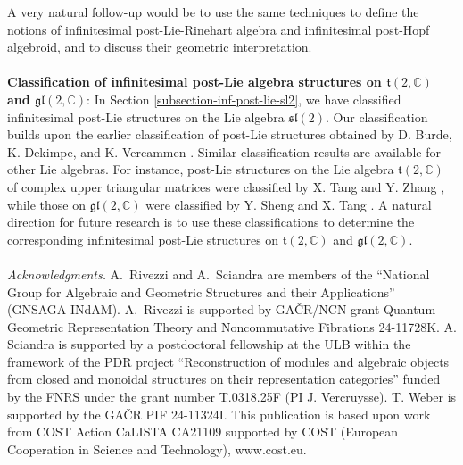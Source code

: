 \documentclass[10pt]{article}
\theoremstyle{definition}
\begin{document}
A very natural follow-up would be to use the same techniques to define the notions of infinitesimal post-Lie-Rinehart algebra and infinitesimal post-Hopf algebroid, and to discuss their geometric interpretation.\\ \\
\textbf{Classification of infinitesimal post-Lie algebra structures on $\mathfrak{t}(2,\mathbb{C})$ and $\mathfrak{gl}(2,\mathbb{C})$}: In Section \ref{subsection-inf-post-lie-sl2}, we have classified infinitesimal post-Lie structures on the Lie algebra $\mathfrak{sl}(2)$. Our classification builds upon the earlier classification of post-Lie structures obtained by D. Burde, K. Dekimpe, and K. Vercammen \cite{BDV}. Similar classification results are available for other Lie algebras. For instance, post-Lie structures on the Lie algebra $\mathfrak{t}(2,\mathbb{C})$ of complex upper triangular matrices were classified by X. Tang and Y. Zhang \cite{TZ}, while those on $\mathfrak{gl}(2,\mathbb{C})$ were classified by Y. Sheng and X. Tang \cite{ST}. A natural direction for future research is to use these classifications to determine the corresponding infinitesimal post-Lie structures on $\mathfrak{t}(2,\mathbb{C})$ and $\mathfrak{gl}(2,\mathbb{C})$.\\ \\ 

\noindent\textit{Acknowledgments.} 
A.\ Rivezzi and A.\ Sciandra are members of the ``National Group for Algebraic and Geometric Structures and their Applications'' (GNSAGA-INdAM). A.\ Rivezzi is supported by GA\v{C}R/NCN grant Quantum Geometric Representation Theory and Noncommutative Fibrations 24-11728K.
A. Sciandra is supported by a postdoctoral fellowship at the ULB within the framework of the PDR project ``Reconstruction of modules and algebraic objects from closed and monoidal structures on their representation categories'' funded by the FNRS under the grant number T.0318.25F (PI J. Vercruysse).
T. Weber is supported by the GA\v{C}R
PIF 24-11324I. This publication is based upon work from COST Action CaLISTA CA21109 supported by COST
(European Cooperation in Science and Technology), www.cost.eu.
\end{document}
